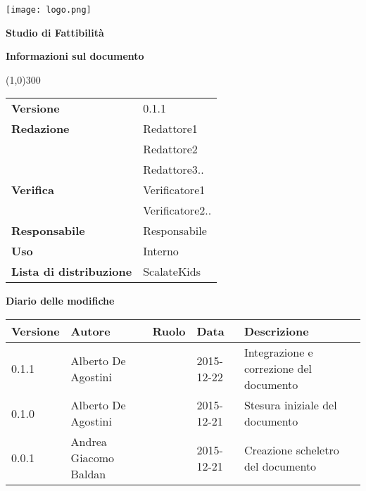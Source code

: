 \documentclass{scalatekids-article}
\begin{document}
\begin{titlepage}
  \centering
  \texttt{[image: logo.png]}\par\vspace{1cm}
  \vspace{1.5cm}
         {\Huge\bfseries Studio di Fattibilità \par}
         \begin{center}
           \vspace{1.0cm}
                  {\large\bfseries Informazioni sul documento \par}
         \end{center}
         \vspace{-1cm}
         \begin{center}
           \line(1,0){300}
         \end{center}
         \vspace{0cm}
         \begin{tabular}[c]{l|l}
           \textbf{Versione} & 0.1.1\\
           \textbf{Redazione} & Redattore1\\ & Redattore2\\ & Redattore3..\\
           \textbf{Verifica} & Verificatore1\\ & Verificatore2..\\
           \textbf{Responsabile} & Responsabile\\
           \textbf{Uso} & Interno\\
           \textbf{Lista di distribuzione} & ScalateKids
         \end{tabular}
\end{titlepage}
\clearpage
\setcounter{page}{1}
\begin{flushleft}
  \vspace{0cm}
         {\large\bfseries Diario delle modifiche \par}
\end{flushleft}
\vspace{0cm}
\begin{center}
  \begin{tabular}{|l | l | l | l | l |}
    \hline
    Versione & Autore & Ruolo & Data & Descrizione \\
    \hline
    0.1.1 & Alberto De Agostini & & 2015-12-22 & Integrazione e correzione del documento\\
    \hline
    0.1.0 & Alberto De Agostini & & 2015-12-21 & Stesura iniziale del documento\\
    \hline
    0.0.1 & Andrea Giacomo Baldan & & 2015-12-21 & Creazione scheletro del documento\\
    \hline
  \end{tabular}
\end{center}
\tableofcontents
\end{document}
